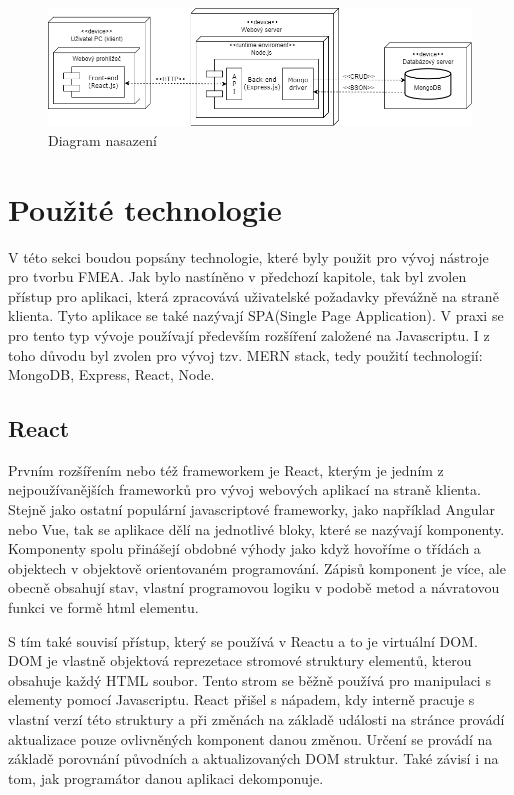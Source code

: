 \begin{figure}[h]
\centering
	\includegraphics[width=1.0\textwidth]{Figures/deploymentDiagram.png}
	\caption{Diagram nasazení}
	\label{fig:architecture}
\end{figure}

\section{Použité technologie}
V této sekci boudou popsány technologie, které byly použit pro vývoj nástroje pro tvorbu FMEA. Jak bylo nastíněno v předchozí kapitole, tak byl zvolen přístup pro aplikaci, která zpracovává uživatelské požadavky převážně na straně klienta. Tyto aplikace se také nazývají SPA(Single Page Application). V praxi se pro tento typ vývoje používají především rozšíření založené na Javascriptu. I z toho důvodu byl zvolen pro vývoj tzv. MERN stack, tedy použití technologií: MongoDB, Express, React, Node. 
\subsection{React}
\label{subsection:react}
\cite{react}Prvním rozšířením nebo též frameworkem je React, kterým je jedním z nejpoužívanějších frameworků pro vývoj webových aplikací na straně klienta. Stejně jako ostatní populární javascriptové frameworky, jako například Angular nebo Vue, tak se aplikace dělí na jednotlivé bloky, které se nazývají komponenty. Komponenty spolu přinášejí obdobné výhody jako když hovoříme o třídách a objektech v objektově orientovaném programování. Zápisů komponent je více, ale obecně obsahují stav, vlastní programovou logiku v podobě metod a návratovou funkci ve formě html elementu.  

S tím také souvisí přístup, který se používá v Reactu a to je virtuální DOM. DOM je vlastně objektová reprezetace stromové struktury elementů, kterou obsahuje každý HTML soubor. Tento strom se běžně používá pro manipulaci s elementy pomocí Javascriptu. React přišel s nápadem, kdy interně pracuje s vlastní verzí této struktury a při změnách na základě události na stránce provádí aktualizace pouze ovlivněných komponent danou změnou. Určení se provádí na základě porovnání původních a aktualizovaných DOM struktur. Také závisí i na tom, jak programátor danou aplikaci dekomponuje. 

